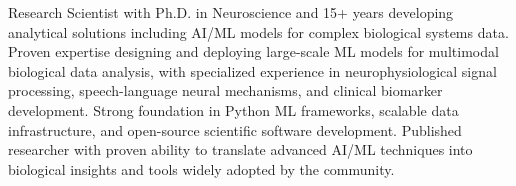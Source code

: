

\begin{cvparagraph}


 Research Scientist with Ph.D. in Neuroscience and 15+ years developing analytical solutions including AI/ML models for complex biological systems data. Proven expertise designing and deploying large-scale ML models for multimodal biological data analysis, with specialized experience in neurophysiological signal processing, speech-language neural mechanisms, and clinical biomarker development. Strong foundation in Python ML frameworks, scalable data infrastructure, and open-source scientific software development. Published researcher with proven ability to translate advanced AI/ML techniques into biological insights and tools widely adopted by the community.
\end{cvparagraph}
